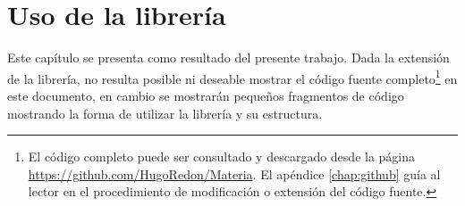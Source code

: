 \chapter{Uso de la librería}
	
	Este capítulo se presenta como resultado del presente trabajo. Dada la extensión de la librería, no resulta posible ni deseable mostrar el código fuente completo\footnote{El código completo puede ser consultado y descargado desde la página \url{https://github.com/HugoRedon/Materia}. El apéndice \ref{chap:github} guía al lector en el procedimiento de modificación o extensión del código fuente.} en este documento, en cambio se mostrarán pequeños fragmentos de código mostrando la forma de utilizar la librería y su estructura.
		
